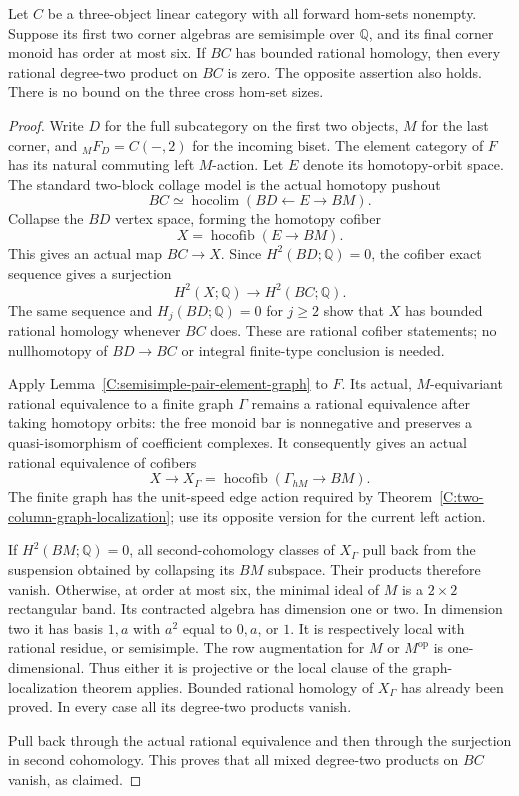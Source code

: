 \begin{theorem}\label{C:semisimple-pair-six-endpoint-cups}
Let $C$ be a three-object linear category with all forward
hom-sets nonempty. Suppose its first two corner algebras are
semisimple over $\mathbb Q$, and its final corner monoid has
order at most six. If $BC$ has bounded rational homology,
then every rational degree-two product on $BC$ is zero.
The opposite assertion also holds. There is no bound on the
three cross hom-set sizes.
\end{theorem}
\begin{proof}
Write $D$ for the full subcategory on the first two objects,
$M$ for the last corner, and ${}_MF_D=C(-,2)$ for the incoming
biset. The element category of $F$ has its natural commuting
left $M$-action. Let $E$ denote its homotopy-orbit space.
The standard two-block collage model is the actual homotopy
pushout
\[
 BC\simeq\operatorname{hocolim}(BD\longleftarrow E
                                      \longrightarrow BM).
\]
Collapse the $BD$ vertex space, forming the homotopy cofiber
\[
 X=\operatorname{hocofib}(E\longrightarrow BM).
\]
This gives an actual map $BC\to X$. Since $H^2(BD;\mathbb Q)=0$,
the cofiber exact sequence gives a surjection
\[
 H^2(X;\mathbb Q)\longrightarrow H^2(BC;\mathbb Q).
\]
The same sequence and $H_j(BD;\mathbb Q)=0$ for $j\geq2$
show that $X$ has bounded rational homology whenever $BC$ does.
These are rational cofiber statements; no nullhomotopy of
$BD\to BC$ or integral finite-type conclusion is needed.

Apply Lemma~\ref{C:semisimple-pair-element-graph} to $F$.
Its actual, $M$-equivariant rational equivalence to a finite
graph $\Gamma$ remains a rational equivalence after taking
homotopy orbits: the free monoid bar is nonnegative and
preserves a quasi-isomorphism of coefficient complexes.
It consequently gives an actual rational equivalence of
cofibers
\[
 X\longrightarrow
 X_\Gamma=\operatorname{hocofib}(\Gamma_{hM}\longrightarrow BM).
\]
The finite graph has the unit-speed edge action required by
Theorem~\ref{C:two-column-graph-localization}; use its opposite
version for the current left action.

If $H^2(BM;\mathbb Q)=0$, all second-cohomology classes of
$X_\Gamma$ pull back from the suspension obtained by collapsing
its $BM$ subspace. Their products therefore vanish.
Otherwise, at order at most six, the minimal ideal of $M$ is
a $2\times2$ rectangular band. Its contracted algebra has
dimension one or two. In dimension two it has basis $1,a$
with $a^2$ equal to $0,a$, or $1$. It is respectively local
with rational residue, or semisimple. The row augmentation
for $M$ or $M^{\mathrm{op}}$ is one-dimensional. Thus either
it is projective or the local clause of the graph-localization
theorem applies. Bounded rational homology of $X_\Gamma$
has already been proved. In every case all its degree-two
products vanish.

Pull back through the actual rational equivalence and then
through the surjection in second cohomology. This proves that
all mixed degree-two products on $BC$ vanish, as claimed.
\end{proof}

